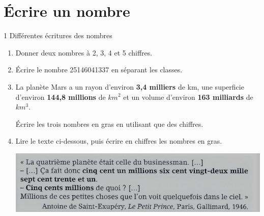 \documentclass[12pt,a4paper]{article}
\date{}
\title{}
\begin{document}




\section{\'Ecrire un nombre}

\begin{myact}{1 Différentes écritures des nombres}

	\label{act:nbres}
	
	\begin{enumerate}
		\item Donner deux nombres à 2, 3, 4 et 5 chiffres.
		
		\item \'Ecrire  le nombre 25146041337 en séparant les classes.
		\item La planète Mars a un rayon d'environ \textbf{3,4 milliers} de km, une superficie d'environ \textbf{144,8 millions} de $km^2$ et un volume d'environ \textbf{163 milliards} de $km^3$.
		
		\'Ecrire les trois nombres en gras en utilisant que des chiffres.
		
		\item Lire le texte ci-dessous, puis écrire en chiffres les nombres en gras.
		
			\begin{center}
				\includegraphics[scale=1.1]{img/act1}
			\end{center}
	\end{enumerate}
\end{myact}
\end{document}
